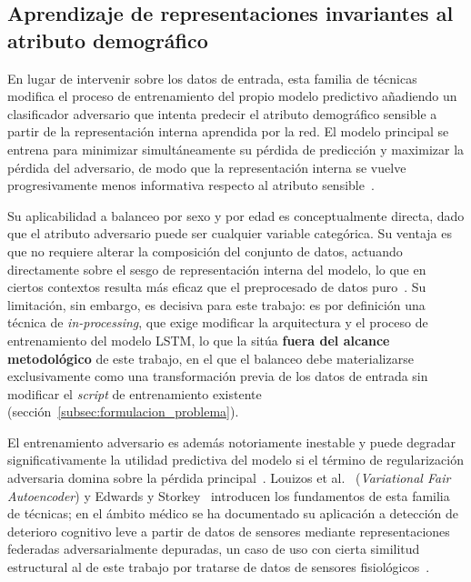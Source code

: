 \subsection{Aprendizaje de representaciones invariantes al atributo demográfico}
\label{subsec:adversarial_debiasing}

En lugar de intervenir sobre los datos de entrada, esta familia de técnicas modifica el proceso de entrenamiento del propio modelo predictivo añadiendo un clasificador adversario que intenta predecir el atributo demográfico sensible a partir de la representación interna aprendida por la red. El modelo principal se entrena para minimizar simultáneamente su pérdida de predicción y maximizar la pérdida del adversario, de modo que la representación interna se vuelve progresivamente menos informativa respecto al atributo sensible~\cite{louizos2016variational,edwards2016censoring,zemel2013fairrepr}.

Su aplicabilidad a balanceo por sexo y por edad es conceptualmente directa, dado que el atributo adversario puede ser cualquier variable categórica. Su ventaja es que no requiere alterar la composición del conjunto de datos, actuando directamente sobre el sesgo de representación interna del modelo, lo que en ciertos contextos resulta más eficaz que el preprocesado de datos puro~\cite{du2019fairnessdeeplearning}. Su limitación, sin embargo, es decisiva para este trabajo: es por definición una técnica de \emph{in-processing}, que exige modificar la arquitectura y el proceso de entrenamiento del modelo LSTM, lo que la sitúa \textbf{fuera del alcance metodológico} de este trabajo, en el que el balanceo debe materializarse exclusivamente como una transformación previa de los datos de entrada sin modificar el \emph{script} de entrenamiento existente (sección~\ref{subsec:formulacion_problema}).

El entrenamiento adversario es además notoriamente inestable y puede degradar significativamente la utilidad predictiva del modelo si el término de regularización adversaria domina sobre la pérdida principal~\cite{du2019fairnessdeeplearning}. Louizos et al.~\cite{louizos2016variational} (\emph{Variational Fair Autoencoder}) y Edwards y Storkey~\cite{edwards2016censoring} introducen los fundamentos de esta familia de técnicas; en el ámbito médico se ha documentado su aplicación a detección de deterioro cognitivo leve a partir de datos de sensores mediante representaciones federadas adversarialmente depuradas, un caso de uso con cierta similitud estructural al de este trabajo por tratarse de datos de sensores fisiológicos~\cite{algorithmfairnessmedicine2021}.

